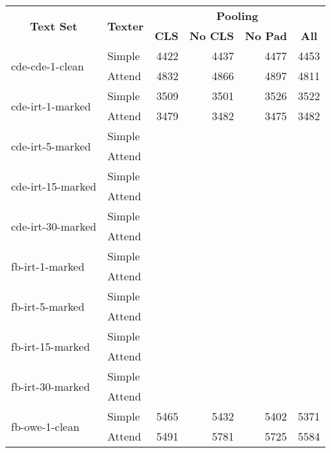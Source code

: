 \begin{tabular}{| l | l | r | r | r | r |}
    \hline

    \multicolumn{1}{|c|}{\multirow{2}{*}{\textbf{Text Set}}} &
    \multicolumn{1}{|c|}{\multirow{2}{*}{\textbf{Texter}}} &
    \multicolumn{4}{|c|}{\textbf{Pooling}} \\

    &
    &
    \multicolumn{1}{|c|}{\textbf{CLS}} &
    \multicolumn{1}{|c|}{\textbf{No CLS}} &
    \multicolumn{1}{|c|}{\textbf{No Pad}} &
    \multicolumn{1}{|c|}{\textbf{All}} \\

    \hline \hline

    \multirow{2}{*}{cde-cde-1-clean}
    & Simple & 4422 & 4437 & 4477 & 4453 \\
    & Attend & 4832 & 4866 & 4897 & 4811 \\ \hline

    \multirow{2}{*}{cde-irt-1-marked}
    & Simple & 3509 & 3501 & 3526 & 3522 \\
    & Attend & 3479 & 3482 & 3475 & 3482 \\ \hline

    \multirow{2}{*}{cde-irt-5-marked}
    & Simple &  &  &  &  \\
    & Attend &  &  &  &  \\ \hline

    \multirow{2}{*}{cde-irt-15-marked}
    & Simple &  &  &  &  \\
    & Attend &  &  &  &  \\ \hline

    \multirow{2}{*}{cde-irt-30-marked}
    & Simple &  &  &  &  \\
    & Attend &  &  &  &  \\ \hline \hline

    \multirow{2}{*}{fb-irt-1-marked}
    & Simple &  &  &  &  \\
    & Attend &  &  &  &  \\ \hline

    \multirow{2}{*}{fb-irt-5-marked}
    & Simple &  &  &  &  \\
    & Attend &  &  &  &  \\ \hline

    \multirow{2}{*}{fb-irt-15-marked}
    & Simple &  &  &  &  \\
    & Attend &  &  &  &  \\ \hline

    \multirow{2}{*}{fb-irt-30-marked}
    & Simple &  &  &  &  \\
    & Attend &  &  &  &  \\ \hline

    \multirow{2}{*}{fb-owe-1-clean}
    & Simple & 5465 & 5432 & 5402 & 5371 \\
    & Attend & 5491 & 5781 & 5725 & 5584 \\ \hline

\end{tabular}

